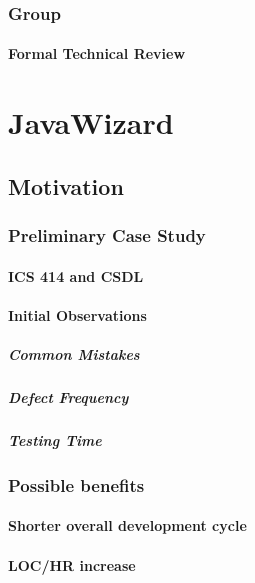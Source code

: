 \subsection{Group}
\subsubsection{Formal Technical Review}




\chapter{JavaWizard}
\section{Motivation}

\subsection{Preliminary Case Study}
\subsubsection{ICS 414 and CSDL}
\subsubsection{Initial Observations}
\paragraph{Common Mistakes}
\paragraph{Defect Frequency}
\paragraph{Testing Time}

\subsection{Possible benefits}
\subsubsection{Shorter overall development cycle}
\subsubsection{LOC/HR increase}
